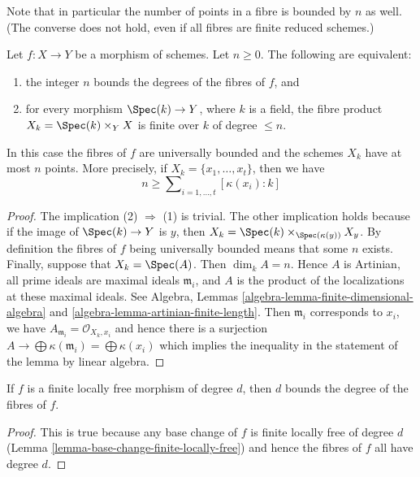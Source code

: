 \noindent
Note that in particular the number of points in a fibre is bounded by $n$
as well. (The converse does not hold, even if all fibres are finite reduced
schemes.)

\begin{lemma}
\label{lemma-characterize-universally-bounded}
Let $f : X \to Y$ be a morphism of schemes. Let $n \geq 0$.
The following are equivalent:
\begin{enumerate}
\item the integer $n$ bounds the degrees of the fibres of $f$, and
\item for every morphism $\Spec(k) \to Y$, where $k$ is a field,
the fibre product $X_k = \Spec(k) \times_Y X$ is finite over $k$
of degree $\leq n$.
\end{enumerate}
In this case the fibres of $f$ are universally bounded and the schemes
$X_k$ have at most $n$ points. More precisely, if
$X_k = \{x_1, \ldots, x_t\}$, then we have
$$
n \geq \sum\nolimits_{i = 1, \ldots, t} [\kappa(x_i) : k]
$$
\end{lemma}

\begin{proof}
The implication (2) $\Rightarrow$ (1) is trivial. The other implication
holds because if the image of $\Spec(k) \to Y$ is $y$, then
$X_k = \Spec(k) \times_{\Spec(\kappa(y))} X_y$. By definition the
fibres of $f$ being universally bounded means that some $n$ exists.
Finally, suppose that $X_k = \Spec(A)$. Then $\dim_k A = n$.
Hence $A$ is Artinian, all prime ideals are maximal ideals $\mathfrak m_i$,
and $A$ is the product of the localizations at these maximal ideals.
See Algebra, Lemmas \ref{algebra-lemma-finite-dimensional-algebra}
and \ref{algebra-lemma-artinian-finite-length}. Then $\mathfrak m_i$
corresponds to $x_i$, we have
$A_{\mathfrak m_i} = \mathcal{O}_{X_k, x_i}$
and hence there is a surjection
$A \to  \bigoplus \kappa(\mathfrak m_i) = \bigoplus \kappa(x_i)$
which implies the inequality in the statement of the lemma
by linear algebra.
\end{proof}

\begin{lemma}
\label{lemma-finite-locally-free-universally-bounded}
If $f$ is a finite locally free morphism of degree $d$, then
$d$ bounds the degree of the fibres of $f$.
\end{lemma}

\begin{proof}
This is true because any base change of $f$ is
finite locally free of degree $d$
(Lemma \ref{lemma-base-change-finite-locally-free})
and hence the fibres of $f$ all have degree $d$.
\end{proof}

